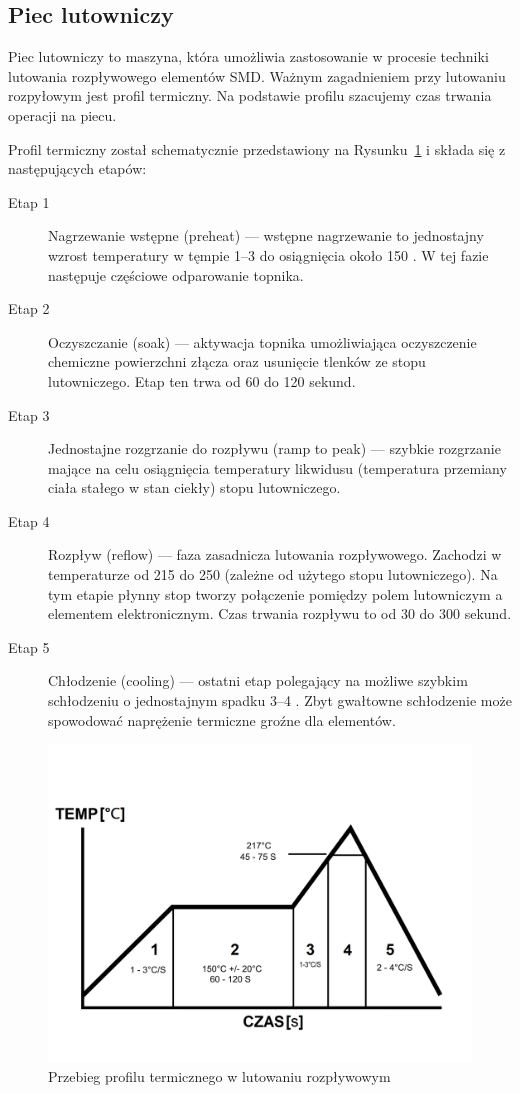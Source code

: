\subsection{Piec lutowniczy}
Piec lutowniczy to maszyna, która umożliwia zastosowanie w procesie techniki lutowania rozpływowego elementów SMD\@. Ważnym zagadnieniem przy lutowaniu rozpyłowym jest profil termiczny. Na podstawie profilu szacujemy czas trwania operacji na piecu.

\breakparagraph{}
Profil termiczny został schematycznie przedstawiony na Rysunku~\ref{schemat_termiczny} i składa się z następujących etapów:
\begin{description}
	\item[Etap 1] Nagrzewanie wstępne (preheat) --- wstępne nagrzewanie to jednostajny wzrost temperatury w tęmpie 1--3  do osiągnięcia około 150 . W tej fazie następuje częściowe odparowanie topnika.
	\item[Etap 2] Oczyszczanie (soak) --- aktywacja topnika umożliwiająca oczyszczenie chemiczne powierzchni złącza oraz usunięcie tlenków ze stopu lutowniczego. Etap ten trwa od 60 do 120 sekund.
	\item[Etap 3] Jednostajne rozgrzanie do rozpływu (ramp to peak) --- szybkie rozgrzanie mające na celu osiągnięcia temperatury likwidusu (temperatura przemiany ciała stałego w stan ciekły) stopu lutowniczego.
	\item[Etap 4] Rozpływ (reflow) --- faza zasadnicza lutowania rozpływowego. Zachodzi w temperaturze od 215 do 250  (zależne od użytego stopu lutowniczego). Na tym etapie płynny stop tworzy połączenie pomiędzy polem lutowniczym a elementem elektronicznym. Czas trwania rozpływu to od 30 do 300 sekund.
	\item[Etap 5] Chłodzenie (cooling) --- ostatni etap polegający na możliwe szybkim schłodzeniu o jednostajnym spadku 3--4 . Zbyt gwałtowne schłodzenie może spowodować naprężenie termiczne groźne dla elementów.
\end{description}

\begin{figure}[H]
	\centering
	\includegraphics[scale=0.2]{./chapters/chapter2/schemat.png}
	\caption{Przebieg profilu termicznego w lutowaniu rozpływowym}
	\label{schemat_termiczny}
\end{figure}

